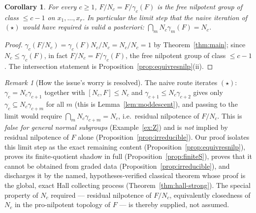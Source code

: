 \documentclass{amsart}
\newtheorem{corollary}{Corollary}
\theoremstyle{definition}
\theoremstyle{remark}
\newtheorem{remark}{Remark}
\begin{document}
\begin{corollary}\label{cor:nilp}
For every $c\ge1$, $F/N_c=F/\gamma_c(F)$ is the free nilpotent group of class $\le
c-1$ on $x_1,\dots,x_r$. In particular the limit step that the naive iteration of
$(\star)$ would have required is valid \emph{a posteriori}:
$\bigcap_{m}N_c\gamma_m(F)=N_c$.
\end{corollary}
\begin{proof}
$\gamma_c(F/N_c)=\gamma_c(F)N_c/N_c=N_c/N_c=1$ by Theorem~\ref{thm:main}; since
$N_c\le\gamma_c(F)$, in fact $F/N_c=F/\gamma_c(F)$, the free nilpotent group of class
$\le c-1$. The intersection statement is Proposition~\ref{prop:equivresnilp}(ii).
\end{proof}

\begin{remark}[How the issue's worry is resolved]\label{rem:issue}
The naive route iterates $(\star)$: $\gamma_c=N_c\gamma_{c+1}$ together with
$[N_c,F]\le N_c$ and $\gamma_{c+1}\le N_c\gamma_{c+2}$ gives only
$\gamma_c\subseteq N_c\gamma_{c+m}$ for all $m$ (this is Lemma~\ref{lem:moddescent}),
and passing to the limit would require $\bigcap_m N_c\gamma_{c+m}=N_c$, i.e.\ residual
nilpotence of $F/N_c$. This is \emph{false for general normal subgroups}
(Example~\ref{ex:Z}) and is \emph{not} implied by residual nilpotence of $F$ alone
(Proposition~\ref{prop:irreducible}). Our proof isolates this limit step as the exact
remaining content (Proposition~\ref{prop:equivresnilp}), proves its finite-quotient
shadow in full (Proposition~\ref{prop:finiteS}), proves that it cannot be obtained
from graded data (Proposition~\ref{prop:irreducible}), and discharges it by the
named, hypotheses-verified classical theorem whose proof is the global, exact Hall
collecting process (Theorem~\ref{thm:hall-strong}). The special property of $N_c$
required --- residual nilpotence of $F/N_c$, equivalently closedness of $N_c$ in the
pro-nilpotent topology of $F$ --- is thereby supplied, not assumed.
\end{remark}
\end{document}
